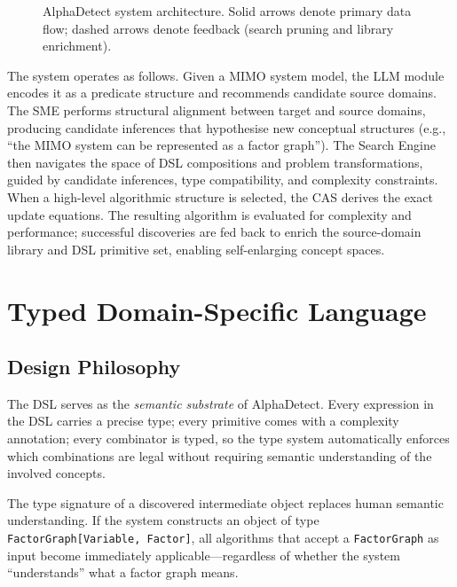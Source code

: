 \documentclass[12pt,a4paper]{article}
\begin{document}
\begin{figure}[H]
\begin{tikzpicture}
\end{tikzpicture}
\caption{AlphaDetect system architecture.  Solid arrows denote primary data
flow; dashed arrows denote feedback (search pruning and library enrichment).}
\label{fig:architecture}
\end{figure}

The system operates as follows.  Given a MIMO system model, the LLM module
encodes it as a predicate structure and recommends candidate source domains.
The SME performs structural alignment between target and source domains,
producing candidate inferences that hypothesise new conceptual structures
(e.g., ``the MIMO system can be represented as a factor graph'').  The Search
Engine then navigates the space of DSL compositions and problem transformations,
guided by candidate inferences, type compatibility, and complexity constraints.
When a high-level algorithmic structure is selected, the CAS derives the exact
update equations.  The resulting algorithm is evaluated for complexity and
performance; successful discoveries are fed back to enrich the source-domain
library and DSL primitive set, enabling self-enlarging concept spaces.

\section{Typed Domain-Specific Language}
\label{sec:dsl}

\subsection{Design Philosophy}

The DSL serves as the \emph{semantic substrate} of AlphaDetect.  Every
expression in the DSL carries a precise type; every primitive comes with a
complexity annotation; every combinator is typed, so the type system
automatically enforces which combinations are legal without requiring
semantic understanding of the involved concepts.

\begin{tcolorbox}[insight]
  The type signature of a discovered intermediate object replaces human semantic
  understanding.  If the system constructs an object of type
  \texttt{FactorGraph[Variable, Factor]}, all algorithms that accept
  a \texttt{FactorGraph} as input become immediately applicable---regardless
  of whether the system ``understands'' what a factor graph means.
\end{tcolorbox}
\end{document}
